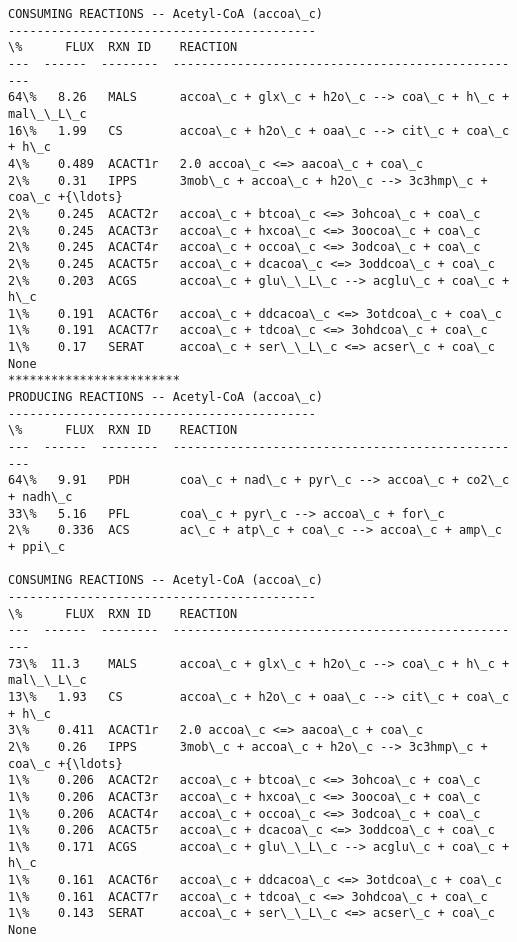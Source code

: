 \documentclass[11pt]{article}
\begin{document}
\begin{Verbatim}[commandchars=\\\{\}]
CONSUMING REACTIONS -- Acetyl-CoA (accoa\_c)
-------------------------------------------
\%      FLUX  RXN ID    REACTION
---  ------  --------  --------------------------------------------------
64\%   8.26   MALS      accoa\_c + glx\_c + h2o\_c --> coa\_c + h\_c + mal\_\_L\_c
16\%   1.99   CS        accoa\_c + h2o\_c + oaa\_c --> cit\_c + coa\_c + h\_c
4\%    0.489  ACACT1r   2.0 accoa\_c <=> aacoa\_c + coa\_c
2\%    0.31   IPPS      3mob\_c + accoa\_c + h2o\_c --> 3c3hmp\_c + coa\_c +{\ldots}
2\%    0.245  ACACT2r   accoa\_c + btcoa\_c <=> 3ohcoa\_c + coa\_c
2\%    0.245  ACACT3r   accoa\_c + hxcoa\_c <=> 3oocoa\_c + coa\_c
2\%    0.245  ACACT4r   accoa\_c + occoa\_c <=> 3odcoa\_c + coa\_c
2\%    0.245  ACACT5r   accoa\_c + dcacoa\_c <=> 3oddcoa\_c + coa\_c
2\%    0.203  ACGS      accoa\_c + glu\_\_L\_c --> acglu\_c + coa\_c + h\_c
1\%    0.191  ACACT6r   accoa\_c + ddcacoa\_c <=> 3otdcoa\_c + coa\_c
1\%    0.191  ACACT7r   accoa\_c + tdcoa\_c <=> 3ohdcoa\_c + coa\_c
1\%    0.17   SERAT     accoa\_c + ser\_\_L\_c <=> acser\_c + coa\_c
None
************************
PRODUCING REACTIONS -- Acetyl-CoA (accoa\_c)
-------------------------------------------
\%      FLUX  RXN ID    REACTION
---  ------  --------  --------------------------------------------------
64\%   9.91   PDH       coa\_c + nad\_c + pyr\_c --> accoa\_c + co2\_c + nadh\_c
33\%   5.16   PFL       coa\_c + pyr\_c --> accoa\_c + for\_c
2\%    0.336  ACS       ac\_c + atp\_c + coa\_c --> accoa\_c + amp\_c + ppi\_c

CONSUMING REACTIONS -- Acetyl-CoA (accoa\_c)
-------------------------------------------
\%      FLUX  RXN ID    REACTION
---  ------  --------  --------------------------------------------------
73\%  11.3    MALS      accoa\_c + glx\_c + h2o\_c --> coa\_c + h\_c + mal\_\_L\_c
13\%   1.93   CS        accoa\_c + h2o\_c + oaa\_c --> cit\_c + coa\_c + h\_c
3\%    0.411  ACACT1r   2.0 accoa\_c <=> aacoa\_c + coa\_c
2\%    0.26   IPPS      3mob\_c + accoa\_c + h2o\_c --> 3c3hmp\_c + coa\_c +{\ldots}
1\%    0.206  ACACT2r   accoa\_c + btcoa\_c <=> 3ohcoa\_c + coa\_c
1\%    0.206  ACACT3r   accoa\_c + hxcoa\_c <=> 3oocoa\_c + coa\_c
1\%    0.206  ACACT4r   accoa\_c + occoa\_c <=> 3odcoa\_c + coa\_c
1\%    0.206  ACACT5r   accoa\_c + dcacoa\_c <=> 3oddcoa\_c + coa\_c
1\%    0.171  ACGS      accoa\_c + glu\_\_L\_c --> acglu\_c + coa\_c + h\_c
1\%    0.161  ACACT6r   accoa\_c + ddcacoa\_c <=> 3otdcoa\_c + coa\_c
1\%    0.161  ACACT7r   accoa\_c + tdcoa\_c <=> 3ohdcoa\_c + coa\_c
1\%    0.143  SERAT     accoa\_c + ser\_\_L\_c <=> acser\_c + coa\_c
None

    \end{Verbatim}


    
    
    
    
\end{document}
